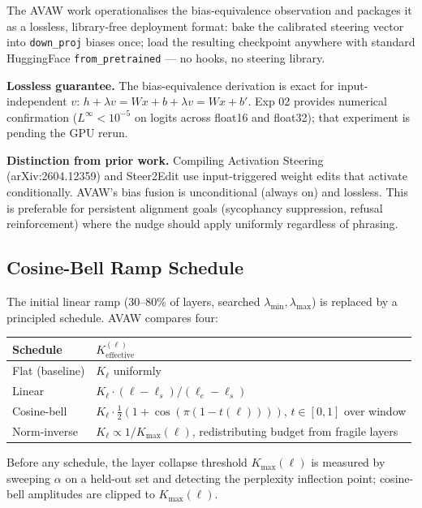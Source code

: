 \documentclass[11pt,a4paper]{article}
\begin{document}
The AVAW work operationalises the bias-equivalence observation and packages it as a lossless, library-free deployment format:
bake the calibrated steering vector into \texttt{down\_proj} biases once;
load the resulting checkpoint anywhere with standard HuggingFace
\texttt{from\_pretrained} — no hooks, no steering library.

\textbf{Lossless guarantee.} The bias-equivalence derivation is exact for
input-independent $v$: $h + \lambda v = Wx + b + \lambda v = Wx + b'$.
Exp 02 provides numerical confirmation ($L^\infty < 10^{-5}$ on logits across
float16 and float32); that experiment is pending the GPU rerun.

\textbf{Distinction from prior work.} Compiling Activation Steering
(arXiv:2604.12359) and Steer2Edit use input-triggered weight edits that
activate conditionally.
AVAW's bias fusion is unconditional (always on) and lossless.
This is preferable for persistent alignment goals (sycophancy suppression,
refusal reinforcement) where the nudge should apply uniformly regardless of
phrasing.

\subsection{Cosine-Bell Ramp Schedule}

The initial linear ramp (30--80\% of layers, searched $\lambda_{\min},
\lambda_{\max}$) is replaced by a principled schedule.
AVAW compares four:

\begin{center}\small
\begin{tabular}{ll}
\toprule
Schedule & $K^{(\ell)}_{\text{effective}}$ \\
\midrule
Flat (baseline) & $K_\ell$ uniformly \\
Linear & $K_\ell \cdot (\ell - \ell_s)/(\ell_e - \ell_s)$ \\
Cosine-bell & $K_\ell \cdot \tfrac{1}{2}(1 + \cos(\pi(1-t(\ell))))$, $t \in [0,1]$ over window \\
Norm-inverse & $K_\ell \propto 1/K_{\max}(\ell)$, redistributing budget from fragile layers \\
\bottomrule
\end{tabular}
\end{center}

Before any schedule, the layer collapse threshold $K_{\max}(\ell)$ is measured
by sweeping $\alpha$ on a held-out set and detecting the perplexity inflection
point; cosine-bell amplitudes are clipped to $K_{\max}(\ell)$.
\end{document}

